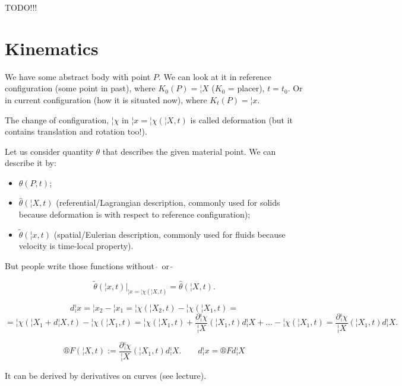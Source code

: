 \documentclass[12pt]{article}					%
\begin{document}

TODO!!!


\section{Kinematics}
\begin{definice}
	We have some abstract body with point $P$. We can look at it in reference configuration (some point in past), where $K_0(P) = ¦X$ ($K_0$ = placer), $t = t_0$. Or in current configuration (how it is situated now), where $K_t(P) = ¦x$.

	The change of configuration, $¦χ$ in $¦x = ¦χ (¦X, t)$ is called deformation (but it contains translation and rotation too!).
\end{definice}

\begin{definice}
	Let us consider quantity $θ$ that describes the given material point. We can describe it by:
	\begin{itemize}
		\item $θ(P, t)$;
		\item $\hat{θ}(¦X, t)$ (referential/Lagrangian description, commonly used for solids because deformation is with respect to reference configuration);
		\item $\tilde θ(¦x, t)$ (spatial/Eulerian description, commonly used for fluids because velocity is time-local property).
	\end{itemize}
	But people write those functions without $\hat{\ }$ or $\tilde{\ }$

	\begin{poznamka}
		$$ \tilde θ(¦x, t)|_{¦x = ¦χ(¦X, t)} = \hat{θ}(¦X, t). $$
	\end{poznamka}
\end{definice}

\begin{definice}
	$$ d¦x = ¦x_2 - ¦x_1 = ¦χ(¦X_2, t) - ¦χ(¦X_1, t) = $$
	$$ = ¦χ(¦X_1 + d¦X, t) - ¦χ(¦X_1, t) = ¦χ(¦X_1, t) + \frac{\partial ¦χ}{¦X}(¦X_1, t) d¦X + … - ¦χ(¦X_1, t) = \frac{\partial ¦χ}{¦X}(¦X_1, t) d¦X. $$

	$$ ®F(¦X, t) := \frac{\partial ¦χ}{¦X}(¦X_1, t) d¦X. \qquad d¦x = ®F d¦X $$

	\begin{poznamkain}
		It can be derived by derivatives on curves (see lecture).
	\end{poznamkain}
\end{definice}
\end{document}
